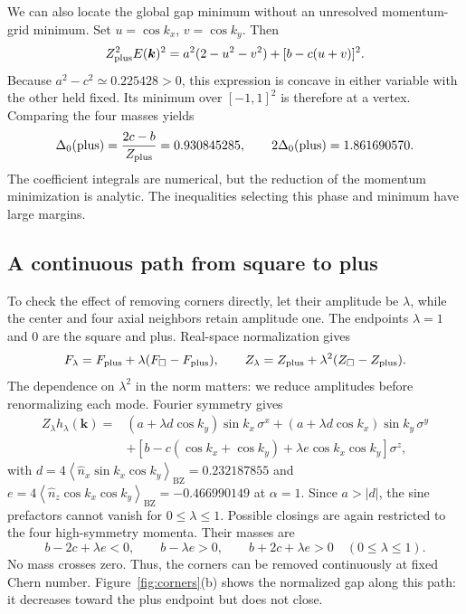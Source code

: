 \documentclass[aps,prb,onecolumn,nofootinbib,superscriptaddress]{revtex4-2}
\newcommand{\bk}{\boldsymbol{k}}
\newcommand{\BZ}{\mathrm{BZ}}
\newcommand{\avg}[1]{\left\langle #1\right\rangle_{\BZ}}
\begin{document}
We can also locate the global gap minimum without an unresolved momentum-grid minimum. Set $u=\cos k_x$, $v=\cos k_y$. Then
\begin{equation}
 Z_{\rm plus}^2E(\bk)^2=a^2(2-u^2-v^2)+[b-c(u+v)]^2.
\end{equation}
Because $a^2-c^2\simeq0.225428>0$, this expression is concave in either variable with the other held fixed. Its minimum over $[-1,1]^2$ is therefore at a vertex. Comparing the four masses yields
\begin{equation}
 \Delta_0({\rm plus})=\frac{2c-b}{Z_{\rm plus}}=0.930845285,
 \qquad 2\Delta_0({\rm plus})=1.861690570.
 \label{eq:plusgap}
\end{equation}
The coefficient integrals are numerical, but the reduction of the momentum minimization is analytic. The inequalities selecting this phase and minimum have large margins.

\subsection{A continuous path from square to plus}

To check the effect of removing corners directly, let their amplitude be $\lambda$, while the center and four axial neighbors retain amplitude one. The endpoints $\lambda=1$ and $0$ are the square and plus. Real-space normalization gives
\begin{equation}
 F_\lambda=F_{\rm plus}+\lambda(F_\square-F_{\rm plus}),\qquad
 Z_\lambda=Z_{\rm plus}+\lambda^2(Z_\square-Z_{\rm plus}).
 \label{eq:path}
\end{equation}
The dependence on $\lambda^2$ in the norm matters: we reduce amplitudes before renormalizing each mode. Fourier symmetry gives
\begin{align}
 Z_\lambda h_\lambda(\bk)={}&(a+\lambda d\cos k_y)\sin k_x\,\sigma^x
 +(a+\lambda d\cos k_x)\sin k_y\,\sigma^y\nonumber\\
 &+\left[b-c(\cos k_x+\cos k_y)+\lambda e\cos k_x\cos k_y\right]\sigma^z,
 \label{eq:pathharmonics}
\end{align}
with $d=4\avg{\widehat n_x\sin k_x\cos k_y}=0.232187855$ and
$e=4\avg{\widehat n_z\cos k_x\cos k_y}=-0.466990149$ at $\alpha=1$.
Since $a>|d|$, the sine prefactors cannot vanish for $0\le\lambda\le1$. Possible closings are again restricted to the four high-symmetry momenta. Their masses are
\begin{equation}
 b-2c+\lambda e<0,\qquad b-\lambda e>0,\qquad b+2c+\lambda e>0
 \quad (0\le\lambda\le1).
\end{equation}
No mass crosses zero. Thus, the corners can be removed continuously at fixed Chern number. Figure~\ref{fig:corners}(b) shows the normalized gap along this path: it decreases toward the plus endpoint but does not close.
\end{document}
